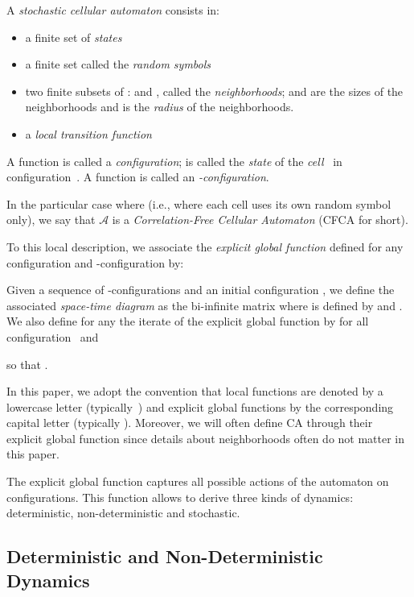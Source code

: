 \documentclass[submission]{fundam}
\newcommand\DELETE[1]{}
\newcommand{\AUTO}[1]{{\ensuremath{\mathcal{#1}}}}
\newcommand\CAA{\AUTO A}
\newcommand\CFCA{\textsf{CFCA}}
\begin{document}
\begin{definition}
\label{def:syntax}
A \emph{stochastic cellular automaton}  consists in:
\begin{itemize}
\item a finite set of \emph{states} 
\item a finite set  called the \emph{random symbols}
\item two finite subsets of :  and , called the \emph{neighborhoods};  and  are the sizes of the neighborhoods and  is the \emph{radius} of the neighborhoods.
\item a \emph{local transition function} 
\end{itemize}
A function  is called a \emph{configuration};  is called the \emph{state} of the \emph{cell}~ in configuration~. A function  is called an \emph{-configuration}.

In the particular case where  (i.e., where each cell uses its own random symbol only), we say that \CAA{} is a \emph{Correlation-Free Cellular Automaton} (\CFCA{} for short).
\end{definition}



\begin{definition}
 To this local description, we associate the \emph{explicit global function}  defined for any configuration  and -configuration  by:

Given a sequence  of -configurations and an initial configuration , we define the associated \emph{space-time diagram} as the bi-infinite matrix  where  is defined by  and . We also define for any  the  iterate of the explicit global function  by  for all configuration~ and 

so that .\DELETE{ We denote by  the stochatic CA whose explicit global function is .}
\end{definition}

In this paper, we adopt the convention that local functions are denoted by a lowercase letter (typically~) and explicit global functions by the corresponding capital letter (typically ). Moreover, we will often define CA through their explicit global function since details about neighborhoods often do not matter in this paper.

The explicit global function captures all possible actions of the automaton on configurations. This function allows to derive three kinds of dynamics: deterministic, non-deterministic and stochastic. 


\subsection{Deterministic and Non-Deterministic Dynamics}
\end{document}
